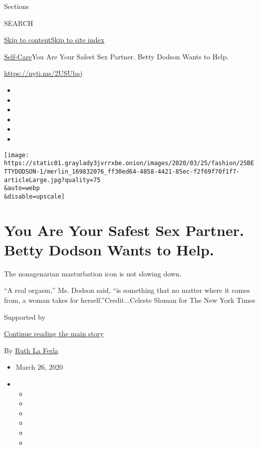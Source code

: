 Sections

SEARCH

\protect\hyperlink{site-content}{Skip to
content}\protect\hyperlink{site-index}{Skip to site index}

\href{/section/style/self-care/}{Self-Care}\textbar{}You Are Your Safest
Sex Partner. Betty Dodson Wants to Help.

\url{https://nyti.ms/2USUbaj}

\begin{itemize}
\item
\item
\item
\item
\item
\item
\end{itemize}

\texttt{[image: https://static01.graylady3jvrrxbe.onion/images/2020/03/25/fashion/25BETTYDODSON-1/merlin\_169832076\_ff30ed64-4858-4421-85ec-f2f69f70f1f7-articleLarge.jpg?quality=75\\\&auto=webp\\\&disable=upscale]}

\hypertarget{you-are-your-safest-sex-partner-betty-dodson-wants-to-help}{%
\section{You Are Your Safest Sex Partner. Betty Dodson Wants to
Help.}\label{you-are-your-safest-sex-partner-betty-dodson-wants-to-help}}

The nonagenarian masturbation icon is not slowing down.

``A real orgasm,'' Ms. Dodson said, ``is something that no matter where
it comes from, a woman takes for herself.''Credit...Celeste Sloman for
The New York Times

Supported by

\protect\hyperlink{after-sponsor}{Continue reading the main story}

By \href{https://www.nytimes3xbfgragh.onion/by/ruth-la-ferla}{Ruth La
Ferla}

\begin{itemize}
\item
  March 26, 2020
\item
  \begin{itemize}
  \item
  \item
  \item
  \item
  \item
  \item
  \end{itemize}
\end{itemize}

